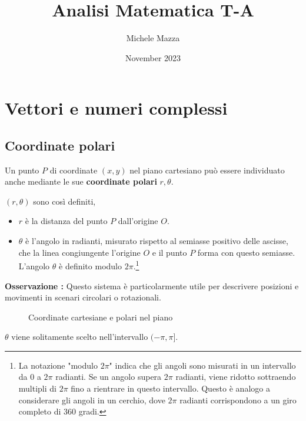 \documentclass{book}
\title{Analisi Matematica T-A}
\author{Michele Mazza}
\date{November 2023}
\begin{document}
\frontmatter
\maketitle
\tableofcontents
\mainmatter

\chapter{Vettori e numeri complessi}

\section{Coordinate polari}
Un punto \(P\) di coordinate \((x , y)\) nel piano cartesiano può essere individuato anche mediante le sue \textbf{coordinate polari} \(r, \theta\).
\begin{definition}
    \((r, \theta)\) sono così definiti,
    \begin{itemize}
        \item \textbf{\(r\)} è la distanza del punto \(P\) dall'origine \(O\).
        \item \textbf{\( \theta \)} è l'angolo in radianti, misurato rispetto al semiasse positivo delle ascisse, che la linea congiungente l'origine \( O \) e il punto \( P \) forma con questo semiasse. L'angolo \( \theta \) è definito modulo \( 2\pi \).\footnote{La notazione "modulo \( 2\pi \)" indica che gli angoli sono misurati in un intervallo da 0 a \( 2\pi \) radianti. Se un angolo supera \( 2\pi \) radianti, viene ridotto sottraendo multipli di \( 2\pi \) fino a rientrare in questo intervallo. Questo è analogo a considerare gli angoli in un cerchio, dove \( 2\pi \) radianti corrispondono a un giro completo di 360 gradi.}
    \end{itemize}
    \textbf{Osservazione :}
    Questo sistema è particolarmente utile per descrivere posizioni e movimenti in scenari circolari o rotazionali.
\end{definition}
\begin{figure}[H]
    \centering
    \caption{Coordinate cartesiane e polari nel piano}
\end{figure}
\(\theta\) viene solitamente scelto nell'intervallo \((-\pi,\pi]\).
\end{document}
